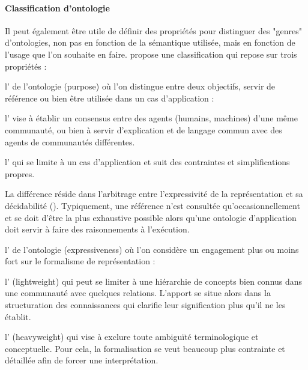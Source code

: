 \paragraph{Classification d'ontologie}
Il peut également être utile de définir des propriétés pour distinguer des "genres" d'ontologies, non pas en fonction de la sémantique utilisée, mais en fonction de l'usage que l'on souhaite en faire. 
\cite{Oberle2006} propose une classification qui repose sur trois propriétés : 
\begin{liste}
	\item l' de l'ontologie (purpose) où l'on distingue entre deux objectifs, servir de référence ou bien être utilisée dans un cas d'application :
	\begin{liste}
		\item l' vise à établir un consensus entre des agents (humains, machines) d'une même communauté, ou bien à servir d'explication et de langage commun avec des agents de communautés différentes. 
		\item l' qui se limite à un cas d'application et suit des contraintes et simplifications propres.
	\end{liste}
	La différence réside dans l'arbitrage entre l'expressivité de la représentation et sa décidabilité (\cite{Borgo2002}). 
	Typiquement, une référence n'est consultée qu'occasionnellement et se doit d'être la plus exhaustive possible alors qu'une ontologie d'application doit servir à faire des raisonnements à l'exécution. 

	\item l' de l'ontologie (expressiveness) où l'on considère un engagement plus ou moins fort sur le formalisme de représentation :
	\begin{liste}
		\item l' (lightweight) qui peut se limiter à une hiérarchie de concepts bien connus dans une communauté avec quelques relations. 
		L'apport se situe alors dans la structuration des connaissances qui clarifie leur signification plus qu'il ne les établit.
		\item l' (heavyweight) qui vise à exclure toute ambiguïté terminologique et conceptuelle.
		Pour cela, la formalisation se veut beaucoup plus contrainte et détaillée afin de forcer une interprétation. 
	\end{liste}


\end{liste}
